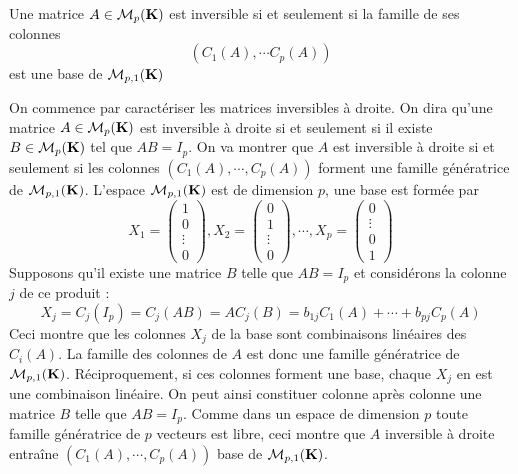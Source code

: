 \begin{prop}
 Une matrice $A\in\mathcal M_{p}(\mathbf{K})$ est inversible si et seulement si la famille de ses colonnes
\begin{displaymath}
 \left(C_1(A),\cdots C_p(A) \right) 
\end{displaymath}
est une base de $\mathcal M_{p,1}(\mathbf{K})$
\end{prop}
\begin{demo}
 On commence par caractériser les matrices inversibles à droite. On dira qu'une matrice $A\in \mathcal M_p(\mathbf{K})$ est inversible à droite si et seulement si il existe $B\in \mathcal M_p(\mathbf{K})$ tel que $AB=I_p$. On va montrer que $A$ est inversible à droite si et seulement si les colonnes $(C_1(A),\cdots,C_p(A))$ forment une famille génératrice de $\mathcal M_{p,1}(\mathbf{K})$.\newline
L'espace $\mathcal M_{p,1}(\mathbf{K})$ est de dimension $p$, une base est formée par
\begin{displaymath}
 X_1 = 
\begin{pmatrix}
1 \\ 0 \\  \vdots \\ 0
\end{pmatrix}
,
 X_2 = 
\begin{pmatrix}
0 \\ 1  \\  \vdots \\ 0
\end{pmatrix}
, \cdots ,
 X_p = 
\begin{pmatrix}
0 \\  \vdots \\ 0 \\1
\end{pmatrix}
\end{displaymath}
Supposons qu'il existe une matrice $B$ telle que $AB=I_p$ et considérons la colonne $j$ de ce produit :
\begin{displaymath}
 X_j = C_j(I_p)=C_j(AB) = AC_j(B) = b_{1j}C_1(A) + \cdots + b_{pj}C_p(A)
\end{displaymath}
Ceci montre que les colonnes $X_j$ de la base sont combinaisons linéaires des $C_i(A)$. La famille des colonnes de $A$ est donc une famille génératrice de $\mathcal M_{p,1}(\mathbf{K})$. Réciproquement, si ces colonnes forment une base, chaque $X_j$ en est une combinaison linéaire. On peut ainsi constituer colonne après colonne une matrice $B$ telle que $AB=I_p$.\newline
Comme dans un espace de dimension $p$ toute famille génératrice de $p$ vecteurs est libre, ceci montre que $A$ inversible à droite entraîne $(C_1(A),\cdots,C_p(A))$ base de $\mathcal M_{p,1}(\mathbf{K})$.


\end{demo}
